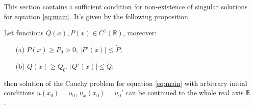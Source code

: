 This section contains a sufficient condition for non-existence of singular solutions for equation \eqref{eq:main}.
It's given by the following proposition.

\begin{proposition}
	Let functions $Q(x), P(x) \in C^1(\mathbb{R})$, moreover:
	\begin{enumerate}
		\item[(a)] $P(x) \ge P_0 > 0$, $|P'(x)| \le \widetilde{P}$;
		\item[(b)] $Q(x) \ge Q_0$, $|Q'(x)| \le \widetilde{Q}$;
	\end{enumerate}
	then solution of the Cauchy problem for equation \eqref{eq:main} with arbitrary initial conditions $u(x_0) = u_0$, $u_{x}(x_0) = u_0'$ can be continued to the whole real axis $\mathbb{R}$.
	\label{prop:absense-of-singular-solutions}
\end{proposition}
